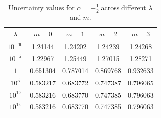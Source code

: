 \documentclass[12pt]{article}
\begin{document}
\begin{table}[htp]
\centering
\begin{tabular}{c|cccc}
\toprule
$\lambda$ & $m=0$ & $m=1$ & $m=2$ & $m=3$ \\
\midrule
$10^{-10}$ & 1.24144  & 1.24202  & 1.24239  & 1.24268 \\
$10^{-5}$  & 1.22967  & 1.25449  & 1.27015  & 1.28271 \\
$1$        & 0.651304 & 0.787014 & 0.869768 & 0.932633 \\
$10^{5}$   & 0.583217 & 0.683772 & 0.747387 & 0.796065 \\
$10^{10}$  & 0.583216 & 0.683770 & 0.747385 & 0.796063 \\
$10^{15}$  & 0.583216 & 0.683770 & 0.747385 & 0.796063 \\
\bottomrule
\end{tabular}
\caption{Uncertainty values for $\alpha = -\tfrac{1}{2}$ across different $\lambda$ and $m$.}
\label{tab:uncertainty-alpha-minus}
\end{table}
\end{document}

